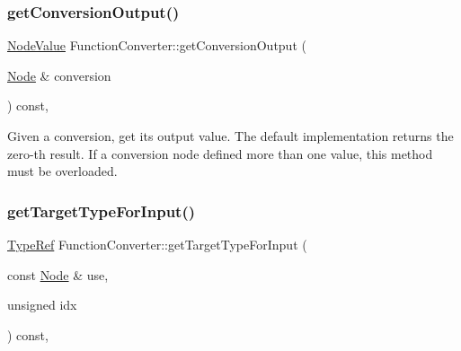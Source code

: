 \subsubsection{\texorpdfstring{get\+Conversion\+Output()}{getConversionOutput()}}
{\footnotesize\ttfamily \hyperlink{structglow_1_1_node_value}{Node\+Value} Function\+Converter\+::get\+Conversion\+Output (\begin{DoxyParamCaption}\item[{\hyperlink{classglow_1_1_node}{Node} \&}]{conversion }\end{DoxyParamCaption}) const\hspace{0.3cm}{\ttfamily [protected]}, {\ttfamily [virtual]}}

Given a {\ttfamily conversion}, get its output value. The default implementation returns the zero-\/th result. If a conversion node defined more than one value, this method must be overloaded. \mbox{\label{classglow_1_1_function_converter_a2039ff94d1abe52dc89d3f7d3350c772}} 
\subsubsection{\texorpdfstring{get\+Target\+Type\+For\+Input()}{getTargetTypeForInput()}}
{\footnotesize\ttfamily \hyperlink{structglow_1_1_type}{Type\+Ref} Function\+Converter\+::get\+Target\+Type\+For\+Input (\begin{DoxyParamCaption}\item[{const \hyperlink{classglow_1_1_node}{Node} \&}]{use,  }\item[{unsigned}]{idx }\end{DoxyParamCaption}) const\hspace{0.3cm}{\ttfamily [protected]}, {\ttfamily [virtual]}}

